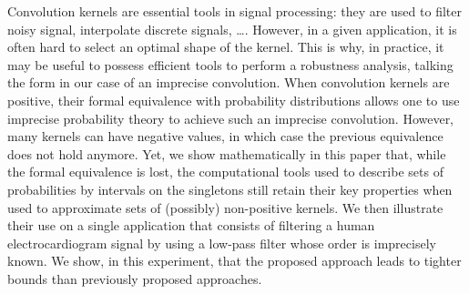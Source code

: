 
Convolution kernels are essential tools in signal processing: they are used to filter noisy signal, interpolate discrete signals, \ldots. However, in a given application, it is often hard to select an optimal shape of the kernel. This is why, in practice, it may be useful to possess efficient tools to perform a robustness analysis, talking the form in our case of an imprecise convolution. When convolution kernels are positive, their formal equivalence with probability distributions allows one to use imprecise probability theory to achieve such an imprecise convolution. However, many kernels can have negative values, in which case the previous equivalence does not hold anymore. Yet, we show mathematically in this paper that, while the formal equivalence is lost, the computational tools used to describe sets of probabilities by intervals on the singletons still retain their key properties when used to approximate sets of (possibly) non-positive kernels. We then illustrate their use on a single application that consists of filtering a human electrocardiogram signal by using a low-pass filter whose order is imprecisely known. We show, in this experiment, that the proposed approach leads to tighter bounds than previously proposed approaches.


